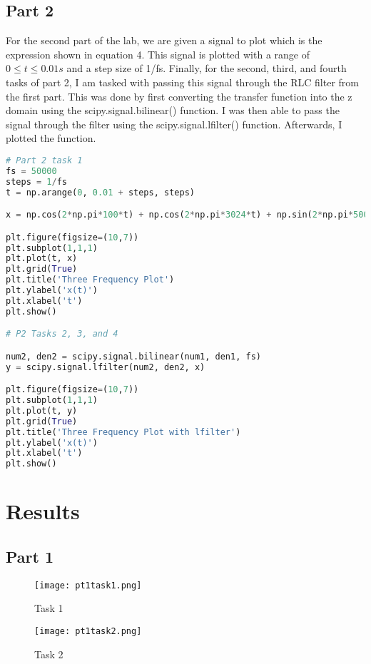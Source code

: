 \documentclass[12pt]{report}
\begin{document}
\subsection{Part 2}
For the second part of the lab, we are given a signal to plot
which is the expression shown in equation 4. This signal is plotted with
a range of \begin{math} 0 \le t \le 0.01s \end{math} and a step size of
1/fs. Finally, for the second, third, and fourth tasks of part 2,
I am tasked with passing this signal through the RLC filter from the
first part. This was done by first converting the transfer function into
the z domain using the scipy.signal.bilinear() function. I was then able
to pass the signal through the filter using the scipy.signal.lfilter()
function. Afterwards, I plotted the function.
\begin{lstlisting}[language=Python]
# Part 2 task 1
fs = 50000
steps = 1/fs
t = np.arange(0, 0.01 + steps, steps)

x = np.cos(2*np.pi*100*t) + np.cos(2*np.pi*3024*t) + np.sin(2*np.pi*50000*t)

plt.figure(figsize=(10,7))
plt.subplot(1,1,1)
plt.plot(t, x)
plt.grid(True)
plt.title('Three Frequency Plot')                           
plt.ylabel('x(t)')
plt.xlabel('t')
plt.show()

# P2 Tasks 2, 3, and 4

num2, den2 = scipy.signal.bilinear(num1, den1, fs)
y = scipy.signal.lfilter(num2, den2, x)

plt.figure(figsize=(10,7))
plt.subplot(1,1,1)
plt.plot(t, y)
plt.grid(True)
plt.title('Three Frequency Plot with lfilter')                           
plt.ylabel('x(t)')
plt.xlabel('t')
plt.show()
\end{lstlisting}
\section{Results}
\subsection{Part 1}
\begin{figure}[H]
\begin{center}
\caption{Task 1}
\texttt{[image: pt1task1.png]}
\end{center}
\end{figure}

\begin{figure}[H]
\begin{center}
\caption{Task 2}
\texttt{[image: pt1task2.png]}
\end{center}
\end{figure}
\end{document}
